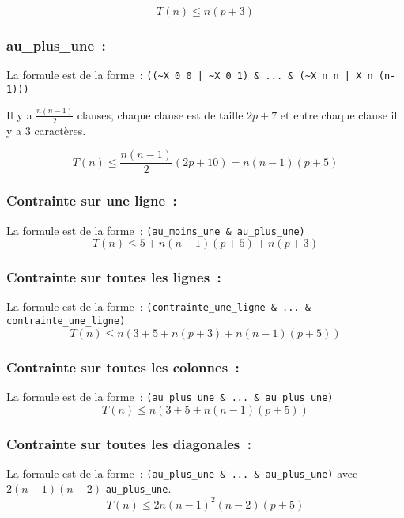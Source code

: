 \begin{equation*}
    T(n) \le n(p+3)
\end{equation*}

\subsubsection*{au\_plus\_une~:}
La formule est de la forme~: \verb$((~X_0_0 | ~X_0_1) & ... & (~X_n_n | X_n_(n-1)))$

Il y a $\frac{n(n-1)}{2}$ clauses, chaque clause est de taille $2p + 7$ et entre
chaque clause il y a $3$ caractères.

\begin{equation*}
    T(n) \le \frac{n(n-1)}{2}(2p + 10) = n(n-1)(p+5)
\end{equation*}
\subsubsection*{Contrainte sur une ligne~:}
La formule est de la forme~: \verb|(au_moins_une & au_plus_une)|
\begin{equation*}
   T(n) \le 5 + n(n-1)(p+5) + n(p+3)
\end{equation*}

\subsubsection*{Contrainte sur toutes les lignes~:}
La formule est de la forme~: \verb|(contrainte_une_ligne & ... & contrainte_une_ligne)|
\begin{equation*}
   T(n) \le n(3 + 5 + n(p+3) + n(n-1)(p+5))
\end{equation*}

\subsubsection*{Contrainte sur toutes les colonnes~:}
La formule est de la forme~: \verb|(au_plus_une & ... & au_plus_une)|
\begin{equation*}
   T(n) \le n(3 + 5 + n(n-1)(p+5))
\end{equation*}

\subsubsection*{Contrainte sur toutes les diagonales~:}
La formule est de la forme~: \verb|(au_plus_une & ... & au_plus_une)|
avec $2(n-1)(n-2)$ \verb|au_plus_une|.
\begin{equation*}
    T(n) \le 2n(n-1)^2(n-2)(p+5)
\end{equation*}

